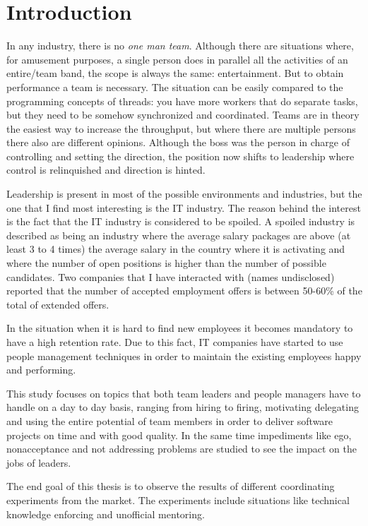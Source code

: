 \chapter{Introduction}
\label{chapter:intro}
In any industry, there is no \textit{one man team}. Although there are situations where, for amusement purposes, a single person does in parallel all the activities of an entire/team band, the scope is always the same: entertainment. But to obtain performance a team is necessary. The situation can be easily compared to the programming concepts of threads: you have more workers that do separate tasks, but they need to be somehow synchronized and  coordinated. Teams are in theory the easiest way to increase the throughput, but where there are multiple persons there also are different opinions. Although the boss was the person in charge of controlling and setting the direction, the position now shifts to leadership where control is relinquished and direction is hinted.

Leadership is present in most of the possible environments and industries, but the one that I find most interesting is the IT industry. The reason behind the interest is the fact that the IT industry is considered to be spoiled. A spoiled industry is described as being an industry where the average salary packages are above (at least 3 to 4 times) the average salary in the country where it is activating and where the number of open positions is higher than the number of possible candidates. Two companies that I have interacted with (names undisclosed) reported that the number of accepted employment offers is between 50-60\% of the total of extended offers. 

In the situation when it is hard to find new employees it becomes mandatory to have a high retention rate. Due to this fact, IT companies have started to use people management techniques in order to maintain the existing employees happy and performing.

This study focuses on topics that both team leaders and people managers have to handle on a day to day basis, ranging from hiring to firing, motivating delegating and using the entire potential of team members in order to deliver software projects on time and with good quality. In the same time impediments like ego, nonacceptance and not addressing problems are studied to see the impact on the jobs of leaders.

The end goal of this thesis is to observe the results of different coordinating experiments from the market. The experiments include situations like technical knowledge enforcing and unofficial mentoring.

